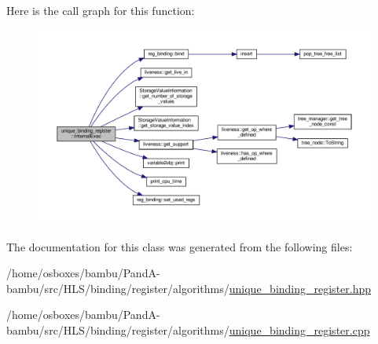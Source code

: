 Here is the call graph for this function\+:
\nopagebreak
\begin{figure}[H]
\begin{center}
\leavevmode
\includegraphics[width=350pt]{d7/dfe/classunique__binding__register_a2ac66d0bc11cd4e54db2042014b52291_cgraph}
\end{center}
\end{figure}


The documentation for this class was generated from the following files\+:\begin{DoxyCompactItemize}
\item 
/home/osboxes/bambu/\+Pand\+A-\/bambu/src/\+H\+L\+S/binding/register/algorithms/\hyperlink{unique__binding__register_8hpp}{unique\+\_\+binding\+\_\+register.\+hpp}\item 
/home/osboxes/bambu/\+Pand\+A-\/bambu/src/\+H\+L\+S/binding/register/algorithms/\hyperlink{unique__binding__register_8cpp}{unique\+\_\+binding\+\_\+register.\+cpp}\end{DoxyCompactItemize}
